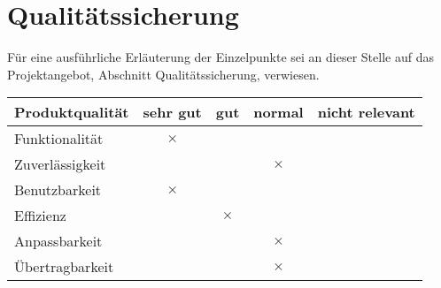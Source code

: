 \section{Qualitätssicherung}
\Hack{\enlargethispage{4\baselineskip}}
Für eine ausführliche Erläuterung der Einzelpunkte sei an dieser Stelle auf das Projektangebot, Abschnitt Qualitätssicherung, verwiesen.
\begin{table}[!h]
  \sffamily
  \begin{tabular}{l c c c c}
    \toprule
    \textbf{Produktqualität} & \textbf{sehr gut} & \textbf{gut} & \textbf{normal} & \textbf{nicht relevant} \\\midrule

    Funktionalität & $\times$ \\
    Zuverlässigkeit &&& $\times$ \\
    Benutzbarkeit &  $\times$ \\
    Effizienz  && $\times$ \\
    Anpassbarkeit &&& $\times$ \\
    Übertragbarkeit &&& $\times$ \\
    \bottomrule
  \end{tabular}
\end{table}


